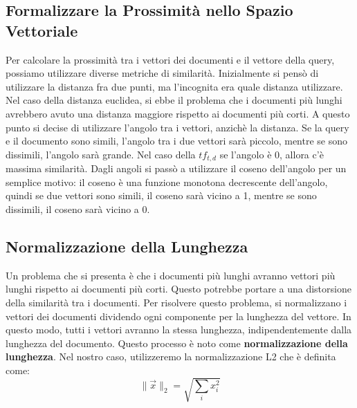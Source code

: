 \documentclass{report}
\begin{document}
	\subsection{Formalizzare la Prossimità nello Spazio Vettoriale}
	Per calcolare la prossimità tra i vettori dei documenti e il vettore della query, possiamo utilizzare diverse metriche di similarità. Inizialmente si pensò di utilizzare la distanza fra due punti, ma l'incognita era quale distanza utilizzare. Nel caso della distanza euclidea, si ebbe il problema che i documenti più lunghi avrebbero avuto una distanza maggiore rispetto ai documenti più corti. A questo punto si decise di utilizzare l'angolo tra i vettori, anzichè la distanza. Se la query e il documento sono simili, l'angolo tra i due vettori sarà piccolo, mentre se sono dissimili, l'angolo sarà grande. Nel caso della $tf_{t,d}$ se l'angolo è 0, allora c'è massima similarità. Dagli angoli si passò a utilizzare il coseno dell'angolo per un semplice motivo: il coseno è una funzione monotona decrescente dell'angolo, quindi se due vettori sono simili, il coseno sarà vicino a 1, mentre se sono dissimili, il coseno sarà vicino a 0.
	
	\subsection{Normalizzazione della Lunghezza}
	Un problema che si presenta è che i documenti più lunghi avranno vettori più lunghi rispetto ai documenti più corti. Questo potrebbe portare a una distorsione della similarità tra i documenti. Per risolvere questo problema, si normalizzano i vettori dei documenti dividendo ogni componente per la lunghezza del vettore. In questo modo, tutti i vettori avranno la stessa lunghezza, indipendentemente dalla lunghezza del documento. Questo processo è noto come \textbf{normalizzazione della lunghezza}. Nel nostro caso, utilizzeremo la normalizzazione L2 che è definita come:
	\[
	\| \overrightarrow{x}  \|_{2} = \sqrt{\sum_{i} x_{i}^{2}} 
	\]
\end{document}

